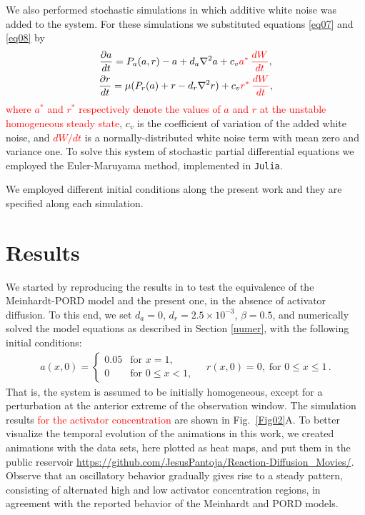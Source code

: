\documentclass[%
 preprint,
 aip, 
 amsmath,amssymb,
]{revtex4-2}
\begin{document}
We also performed stochastic simulations in which additive white noise was added to the system. For these simulations we substituted equations \eqref{eq07} and
	\eqref{eq08} by
	\begin{subequations}\label{eq1112}
		\begin{gather}
		\frac{\partial a}{dt} = P_a(a, r) - a + d_a \nabla^2 a + c_v \textcolor{red}{a^* \,\frac{dW}{dt}}, \label{eq11} \\
		\frac{\partial r}{dt}= \mu (P_r(a) + r - d_r \nabla^2 r) + c_v \textcolor{red}{r^* \,\frac{dW}{dt}}, \label{eq12}
		\end{gather}
	\end{subequations}
\textcolor{red}{where $a^*$ and $r^*$ respectively denote the  values of  $a$ and $r$ at the unstable homogeneous steady state}, $c_v$ is the coefficient of variation of the added white noise, and \textcolor{red}{$dW/dt$} is a normally-distributed white noise term with mean zero and variance one. To solve this system of stochastic partial differential equations we employed the Euler-Maruyama method, implemented in \texttt{Julia}.
	
We employed different initial conditions along the present work and they are  specified along each simulation.

\section{Results}
\label{res}
	
We started by reproducing the results in \cite{Cotterell2015} to test the equivalence of the Meinhardt-PORD model and the present one, in the absence of activator diffusion. To this end, we set $d_a=0$, $d_r = 2.5\times10^{-3}$, $\beta = 0.5$, and numerically solved the model equations as described in Section \ref{numer}, with the following initial conditions:
	\begin{gather}
	a(x, 0) = \left\{\begin{array}{cl}
	0.05 & \text{for } x = 1, \\
	0 & \text{for } 0 \leq x < 1,
	\end{array} \right. 
	\quad
	r(x, 0) = 0, \; \text{for } 0 \leq x \leq 1\,.
	\end{gather}
That is, the system is assumed to be initially homogeneous, except for a perturbation at the anterior extreme of the observation window. The simulation results \textcolor{red}{for the activator concentration} are shown in Fig.~\ref{Fig02}A. To better visualize the temporal evolution of the animations in this work, we created animations with the data sets, here plotted as heat maps, and put them in the public reservoir \url{https://github.com/JesusPantoja/Reaction-Diffusion_Movies/}. Observe that an oscillatory behavior gradually gives rise to a steady pattern, consisting of alternated high and low activator concentration regions, in agreement with the reported behavior of the Meinhardt \cite{Meinhardt1982} and PORD \citep{Cotterell2015} models. 
	
\end{document}
